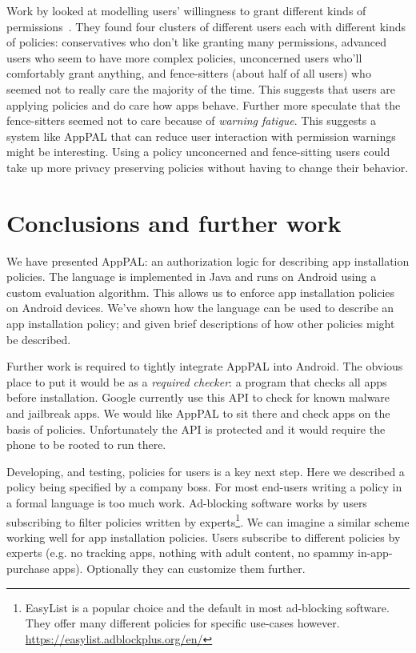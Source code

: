 \documentclass[a4paper]{scrartcl}
\newcommand{\comment}[1]{}%
\begin{document}
Work by \citeauthor{Sadeh:2014vq} looked at modelling users' willingness to grant different kinds of permissions~\citep{Sadeh:2014vq}.
They found four clusters of different users each with different kinds of policies:
  conservatives who don't like granting many permissions,
  advanced users who seem to have more complex policies,
  unconcerned users who'll comfortably grant anything,
  and fence-sitters (about half of all users) who seemed not to really care the majority of the time.
This suggests that users are applying policies and do care how apps behave.
Further more \citeauthor{Sadeh:2014vq} speculate that the fence-sitters seemed not to care because of \emph{warning fatigue}.
This suggests a system like AppPAL that can reduce user interaction with permission warnings might be interesting.
Using a policy unconcerned and fence-sitting users could take up more privacy preserving policies without having to change their behavior.

\section{Conclusions and further work \comment{$\frac{1}{2}$ page}}

We have presented AppPAL: an authorization logic for describing app installation policies.
The language is implemented in Java and runs on Android using a custom evaluation algorithm.
This allows us to enforce app installation policies on Android devices.
We've shown how the language can be used to describe an app installation policy;
  and given brief descriptions of how other policies might be described.

Further work is required to tightly integrate AppPAL into Android.
The obvious place to put it would be as a \emph{required checker}: a program that checks all apps before installation.
Google currently use this API to check for known malware and jailbreak apps.
We would like AppPAL to sit there and check apps on the basis of policies.
Unfortunately the API is protected and it would require the phone to be rooted to run there.

Developing, and testing, policies for users is a key next step.
Here we described a policy being specified by a company boss.
For most end-users writing a policy in a formal language is too much work.
Ad-blocking software works by users subscribing to filter policies written by experts\footnote{EasyList is a popular choice and the default in most ad-blocking software. They offer many different policies for specific use-cases however. \url{https://easylist.adblockplus.org/en/}}.
We can imagine a similar scheme working well for app installation policies.
Users subscribe to different policies by experts (e.g. no tracking apps, nothing with adult content, no spammy in-app-purchase apps).
Optionally they can customize them further.
\end{document}
